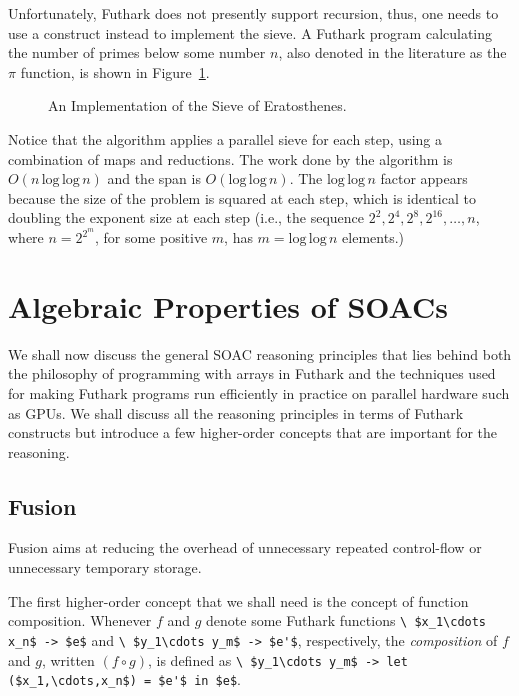 \documentclass[oneside,11pt]{book}
\renewcommand{\log}{\ensuremath{\mathrm{log}}}
\newenvironment{wrap}{\vspace{\topskip}\par\noindent\begin{minipage}{\linewidth}}{\end{minipage}\par}
\begin{document}
Unfortunately, Futhark does not presently support recursion, thus, one
needs to use a  construct instead to implement the sieve.  A
Futhark program calculating the number of primes below some number
$n$, also denoted in the literature as the $\pi$ function, is shown in
Figure~\ref{fig:primes}.

\begin{figure}
\begin{wrap}

\end{wrap}
\caption{An Implementation of the Sieve of Eratosthenes.}
\label{fig:primes}
\end{figure}

Notice that the algorithm applies a parallel sieve for each step,
using a combination of maps and reductions. The work done by the
algorithm is $O(n\,\log\,\log\,n)$ and the span is
$O(\log\,\log\,n)$. The $\log\,\log\,n$ factor appears because the
size of the problem is squared at each step, which is identical to doubling the exponent size at each
step (i.e., the sequence $2^2, 2^4, 2^8, 2^{16}, \ldots, n$, where $n=2^{2^m}$, for some positive $m$, has $m = \log\,\log\,n$ elements.)

\chapter{Algebraic Properties of SOACs}
\label{chap:soac-algebra}

We shall now discuss the general SOAC reasoning principles that lies
behind both the philosophy of programming with arrays in Futhark and
the techniques used for making Futhark programs run efficiently in
practice on parallel hardware such as GPUs. We shall discuss all the
reasoning principles in terms of Futhark constructs but introduce a
few higher-order concepts that are important for the reasoning.

\section{Fusion}

Fusion aims at reducing the overhead of unnecessary repeated
control-flow or unnecessary temporary storage.

The first higher-order concept that we shall need is the concept of
function composition. Whenever $f$ and $g$ denote some Futhark
functions
%
\lstinline[mathescape=true]!\ $x_1\cdots x_n$ -> $e$! and
%
\lstinline[mathescape=true]!\ $y_1\cdots y_m$ -> $e'$!, respectively, the
\emph{composition} of $f$ and $g$, written $(f \circ g)$, is defined as
%
\lstinline[mathescape=true]!\ $y_1\cdots y_m$ -> let ($x_1,\cdots,x_n$) = $e'$ in $e$!.
\end{document}
